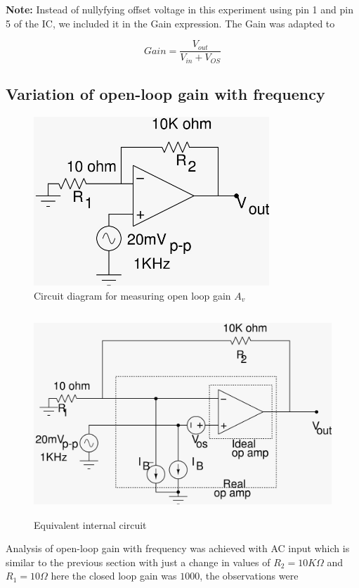 \documentclass[12pt]{article}
\begin{document}
      \textbf{Note:} Instead of nullyfying offset voltage in this experiment using pin 1 and pin 5 of the IC, we included it in the Gain expression. The Gain was adapted to 
      
      \begin{equation}
          Gain = \frac{V_{out}}{V_{in} + V_{OS}}
      \end{equation}
       
\subsection{Variation of open-loop gain with frequency}
        \begin{figure}[H]
            \centering
            \includegraphics[width = 0.5\linewidth, height = 2.5in]{olg.jpeg}
            \caption{Circuit diagram for measuring open loop gain $A_v$}
        \end{figure}
        \begin{figure}[H]
            \centering
            \includegraphics[width = 0.8\linewidth, height = 3in]{olgreal.jpeg}
            \caption{Equivalent internal circuit}
        \end{figure}
      Analysis of open-loop gain with frequency was achieved with AC input which is similar to the previous section with just a change in values of $R_2 = 10K\Omega$ and $R_1 = 10\Omega$ here the closed loop gain was $1000$, the observations were
        
\end{document}
